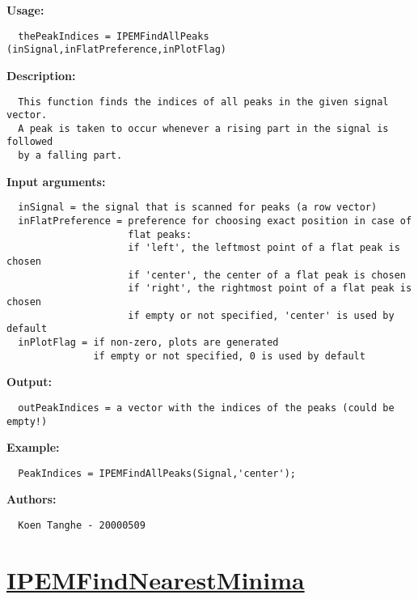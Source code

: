 \textbf{Usage:}
\begin{verbatim}  thePeakIndices = IPEMFindAllPeaks (inSignal,inFlatPreference,inPlotFlag)

\end{verbatim}
\textbf{Description:}
\begin{verbatim}  This function finds the indices of all peaks in the given signal vector.
  A peak is taken to occur whenever a rising part in the signal is followed
  by a falling part.

\end{verbatim}
\textbf{Input arguments:}
\begin{verbatim}  inSignal = the signal that is scanned for peaks (a row vector)
  inFlatPreference = preference for choosing exact position in case of
                     flat peaks:
                     if 'left', the leftmost point of a flat peak is chosen
                     if 'center', the center of a flat peak is chosen
                     if 'right', the rightmost point of a flat peak is chosen
                     if empty or not specified, 'center' is used by default
  inPlotFlag = if non-zero, plots are generated
               if empty or not specified, 0 is used by default

\end{verbatim}
\textbf{Output:}
\begin{verbatim}  outPeakIndices = a vector with the indices of the peaks (could be empty!) 

\end{verbatim}
\textbf{Example:}
\begin{verbatim}  PeakIndices = IPEMFindAllPeaks(Signal,'center');

\end{verbatim}
\textbf{Authors:}
\begin{verbatim}  Koen Tanghe - 20000509
\end{verbatim}


\newpage
\section*{\hyperlink{Concepts:IPEMFindNearestMinima}{IPEMFindNearestMinima}}
\hypertarget{FuncRef:IPEMFindNearestMinima}{}

